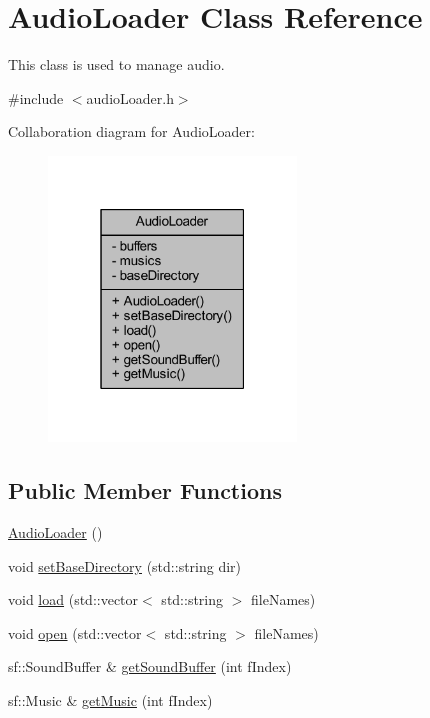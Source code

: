 \hypertarget{class_audio_loader}{}\section{Audio\+Loader Class Reference}
\label{class_audio_loader}


This class is used to manage audio.  




{\ttfamily \#include $<$audio\+Loader.\+h$>$}



Collaboration diagram for Audio\+Loader\+:\nopagebreak
\begin{figure}[H]
\begin{center}
\leavevmode
\includegraphics[width=187pt]{class_audio_loader__coll__graph}
\end{center}
\end{figure}
\subsection*{Public Member Functions}
\begin{DoxyCompactItemize}
\item 
\hyperlink{class_audio_loader_a9fe737693de78ab56e73e256cb6474be}{Audio\+Loader} ()
\item 
void \hyperlink{class_audio_loader_a1c836fdf869fa42be7e7d15d52686cf6}{set\+Base\+Directory} (std\+::string dir)
\item 
void \hyperlink{class_audio_loader_ab7182e383a203504a6e8bbd7759088ce}{load} (std\+::vector$<$ std\+::string $>$ file\+Names)
\item 
void \hyperlink{class_audio_loader_a9d8509fa148b954bdac29316e84a26ba}{open} (std\+::vector$<$ std\+::string $>$ file\+Names)
\item 
sf\+::\+Sound\+Buffer \& \hyperlink{class_audio_loader_a8196533d566484ed144f209a41d4ede4}{get\+Sound\+Buffer} (int f\+Index)
\item 
sf\+::\+Music \& \hyperlink{class_audio_loader_adb279e55d3e23c58f8171307fa08180a}{get\+Music} (int f\+Index)
\end{DoxyCompactItemize}
